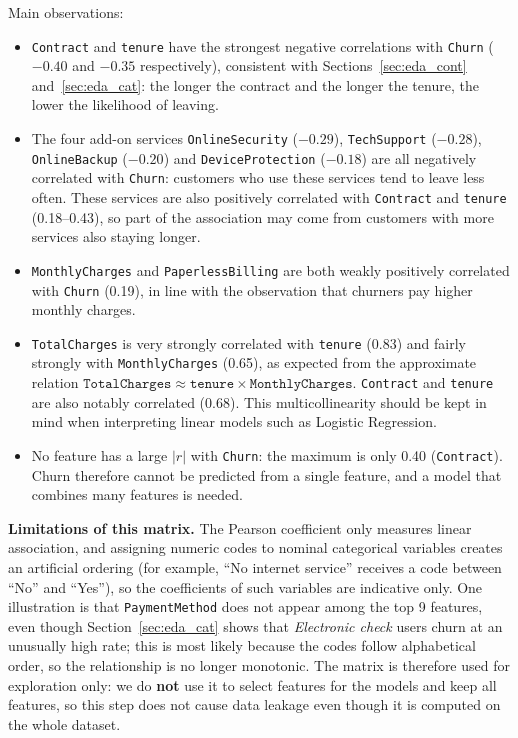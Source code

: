 Main observations:
\begin{itemize}
    \item \texttt{Contract} and \texttt{tenure} have the strongest negative correlations with \texttt{Churn} ($-0.40$ and $-0.35$ respectively), consistent with Sections~\ref{sec:eda_cont} and~\ref{sec:eda_cat}: the longer the contract and the longer the tenure, the lower the likelihood of leaving.
    \item The four add-on services \texttt{OnlineSecurity} ($-0.29$), \texttt{TechSupport} ($-0.28$), \texttt{OnlineBackup} ($-0.20$) and \texttt{DeviceProtection} ($-0.18$) are all negatively correlated with \texttt{Churn}: customers who use these services tend to leave less often. These services are also positively correlated with \texttt{Contract} and \texttt{tenure} (0.18--0.43), so part of the association may come from customers with more services also staying longer.
    \item \texttt{MonthlyCharges} and \texttt{PaperlessBilling} are both weakly positively correlated with \texttt{Churn} (0.19), in line with the observation that churners pay higher monthly charges.
    \item \texttt{TotalCharges} is very strongly correlated with \texttt{tenure} (0.83) and fairly strongly with \texttt{MonthlyCharges} (0.65), as expected from the approximate relation $\texttt{TotalCharges} \approx \texttt{tenure} \times \texttt{MonthlyCharges}$. \texttt{Contract} and \texttt{tenure} are also notably correlated (0.68). This multicollinearity should be kept in mind when interpreting linear models such as Logistic Regression.
    \item No feature has a large $|r|$ with \texttt{Churn}: the maximum is only 0.40 (\texttt{Contract}). Churn therefore cannot be predicted from a single feature, and a model that combines many features is needed.
\end{itemize}

\textbf{Limitations of this matrix.} The Pearson coefficient only measures linear association, and assigning numeric codes to nominal categorical variables creates an artificial ordering (for example, ``No internet service'' receives a code between ``No'' and ``Yes''), so the coefficients of such variables are indicative only. One illustration is that \texttt{PaymentMethod} does not appear among the top 9 features, even though Section~\ref{sec:eda_cat} shows that \textit{Electronic check} users churn at an unusually high rate; this is most likely because the codes follow alphabetical order, so the relationship is no longer monotonic. The matrix is therefore used for exploration only: we do \textbf{not} use it to select features for the models and keep all features, so this step does not cause data leakage even though it is computed on the whole dataset.

